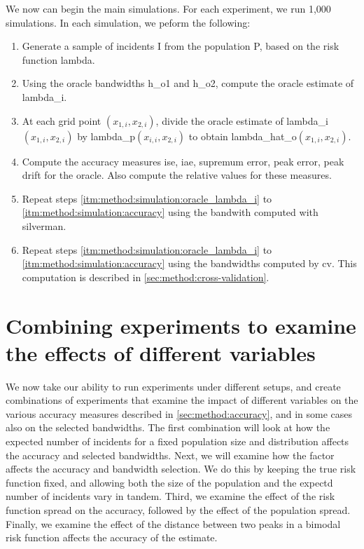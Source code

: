We now can begin the main simulations.
For each experiment, we run 1,000 simulations.
In each simulation, we peform the following:
\begin{enumerate}
    \item\label{itm:method:simulation:generate} Generate a sample of incidents \gls{I} from the population \gls{P}, based on the risk function \gls{lambda}.
    \item\label{itm:method:simulation:oracle_lambda_i} Using the \gls{oracle} bandwidths \gls{h_o1} and \gls{h_o2}, compute the \gls{oracle} estimate of \gls{lambda_i}.
    \item\label{itm:method:simulation:oracle_lambda_hat} At each grid point $(x_{1,i}, x_{2,i})$, divide the oracle estimate of \gls{lambda_i}$(x_{1,i}, x_{2,i})$ by \gls{lambda_p}$(x_{i,i}, x_{2,i})$ to obtain \gls{lambda_hat_o}$(x_{1,i}, x_{2,i})$.
    \item\label{itm:method:simulation:accuracy} Compute the accuracy measures \gls{ise}, \gls{iae}, \gls{supremum error}, \gls{peak error}, \gls{peak drift} for the \gls{oracle}.
    Also compute the relative values for these measures.
    \item\label{itm:method:simulation:silverman_lambda_i} Repeat steps \ref{itm:method:simulation:oracle_lambda_i} to \ref{itm:method:simulation:accuracy} using the bandwith computed with \gls{silverman}.
    \item\label{itm:method:simulation:cv_lambda_i} Repeat steps \ref{itm:method:simulation:oracle_lambda_i} to \ref{itm:method:simulation:accuracy} using the bandwidths computed by \gls{cv}.
    This computation is described in \cref{sec:method:cross-validation}.
\end{enumerate}

\section[Combining experiments]{Combining experiments to examine the effects of different variables}
\label{sec:method:combining_experiments}

We now take our ability to run experiments under different setups,
and create combinations of experiments that examine the impact of different variables on the various accuracy measures described in \cref{sec:method:accuracy},
and in some cases also on the selected bandwidths.
The first combination will look at how the expected number of incidents for a fixed population size and distribution affects the accuracy and selected bandwidths.
Next, we will examine how the \gls{factor} affects the accuracy and bandwidth selection.
We do this by keeping the true risk function fixed, and allowing both the size of the population and the expectd number of incidents vary in tandem.
Third, we examine the effect of the risk function spread on the accuracy, followed by the effect of the population spread.
Finally, we examine the effect of the distance between two peaks in a bimodal risk function affects the accuracy of the estimate.

